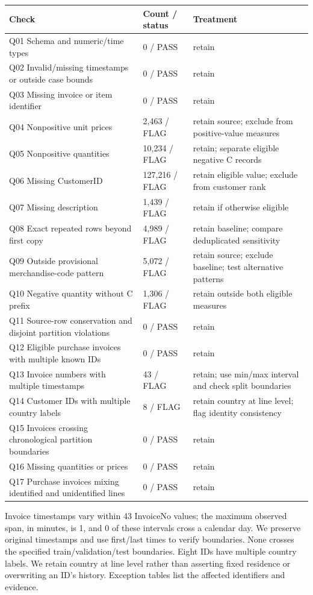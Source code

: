 \documentclass[10pt,a4paper]{article}
\begin{document}
{\small
\begin{tabularx}{\linewidth}{@{}P{.43\linewidth}P{.15\linewidth}Y@{}}
\toprule
\textbf{Check} & \textbf{Count / status} & \textbf{Treatment} \\ \midrule
Q01 Schema and numeric/time types & 0 / PASS & retain \\
Q02 Invalid/missing timestamps or outside case bounds & 0 / PASS & retain \\
Q03 Missing invoice or item identifier & 0 / PASS & retain \\
Q04 Nonpositive unit prices & 2,463 / FLAG & retain source; exclude from positive-value measures \\
Q05 Nonpositive quantities & 10,234 / FLAG & retain; separate eligible negative C records \\
Q06 Missing CustomerID & 127,216 / FLAG & retain eligible value; exclude from customer rank \\
Q07 Missing description & 1,439 / FLAG & retain if otherwise eligible \\
Q08 Exact repeated rows beyond first copy & 4,989 / FLAG & retain baseline; compare deduplicated sensitivity \\
Q09 Outside provisional merchandise-code pattern & 5,072 / FLAG & retain source; exclude baseline; test alternative patterns \\
Q10 Negative quantity without C prefix & 1,306 / FLAG & retain outside both eligible measures \\
Q11 Source-row conservation and disjoint partition violations & 0 / PASS & retain \\
Q12 Eligible purchase invoices with multiple known IDs & 0 / PASS & retain \\
Q13 Invoice numbers with multiple timestamps & 43 / FLAG & retain; use min/max interval and check split boundaries \\
Q14 Customer IDs with multiple country labels & 8 / FLAG & retain country at line level; flag identity consistency \\
Q15 Invoices crossing chronological partition boundaries & 0 / PASS & retain \\
Q16 Missing quantities or prices & 0 / PASS & retain \\
Q17 Purchase invoices mixing identified and unidentified lines & 0 / PASS & retain \\
\bottomrule\end{tabularx}
}

Invoice timestamps vary within 43 InvoiceNo values; the maximum observed span, in minutes, is 1, and 0 of these intervals cross a calendar day. We preserve original timestamps and use first/last times to verify boundaries. None crosses the specified train/validation/test boundaries. Eight IDs have multiple country labels. We retain country at line level rather than asserting fixed residence or overwriting an ID's history. Exception tables list the affected identifiers and evidence.
\end{document}
